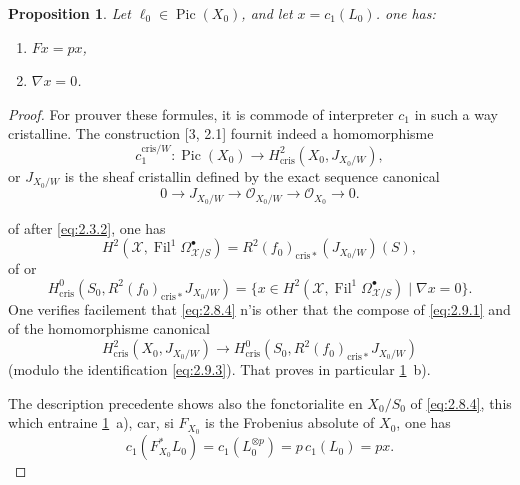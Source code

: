 \documentclass[12pt,a4paper]{article}
\theoremstyle{plain}
\newtheorem{proposition}[theorem]{Proposition}
\theoremstyle{definition}
\theoremstyle{remark}
\DeclareMathOperator{\Pic}{Pic}
\DeclareMathOperator{\Fil}{Fil}
\newcommand{\cris}{\mathrm{cris}}
\begin{document}
\begin{proposition}\label{prop:2.9}
Let $\ell_0 \in \Pic(X_0)$, and let $x = c_1(L_0)$. one has:
\begin{enumerate}[label=\alph*)]
\item $Fx = px$,
\item $\nabla x = 0$.
\end{enumerate}
\end{proposition}

\begin{proof}
For prouver these formules, it is commode of interpreter $c_1$ in such a way cristalline. The construction [3, 2.1] fournit indeed a homomorphisme
\begin{equation}\label{eq:2.9.1}
c_1^{\cris/W}: \Pic(X_0) \to H^2_{\cris}(X_0, J_{X_0/W}),
\end{equation}
or $J_{X_0/W}$ is the sheaf cristallin defined by the exact sequence canonical
\begin{equation}\label{eq:2.9.2}
0 \to J_{X_0/W} \to \mathcal{O}_{X_0/W} \to \mathcal{O}_{X_0} \to 0.
\end{equation}

of after \eqref{eq:2.3.2}, one has
\[
H^2(\mathcal{X}, \Fil^1 \Omega^{\bullet}_{\mathcal{X}/S}) = R^2(f_0)_{\cris*}(J_{X_0/W})(S),
\]
of or
\begin{equation}\label{eq:2.9.3}
H^0_{\cris}(S_0, R^2(f_0)_{\cris*} J_{X_0/W}) = \{x \in H^2(\mathcal{X}, \Fil^1 \Omega^{\bullet}_{\mathcal{X}/S}) \mid \nabla x = 0\}.
\end{equation}
One verifies facilement that \eqref{eq:2.8.4} n'is other that the compose of \eqref{eq:2.9.1} and of the homomorphisme canonical
\begin{equation}\label{eq:2.9.4}
H^2_{\cris}(X_0, J_{X_0/W}) \to H^0_{\cris}(S_0, R^2(f_0)_{\cris*} J_{X_0/W})
\end{equation}
(modulo the identification \eqref{eq:2.9.3}). That proves in particular \ref{prop:2.9}~b).

The description precedente shows also the fonctorialite en $X_0/S_0$ of \eqref{eq:2.8.4}, this which entraine \ref{prop:2.9}~a), car, si $F_{X_0}$ is the Frobenius absolute of $X_0$, one has
\[
c_1(F_{X_0}^* L_0) = c_1(L_0^{\otimes p}) = p\, c_1(L_0) = px.
\]\qedhere
\end{proof}
\end{document}
